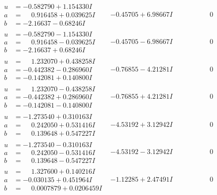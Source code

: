 \documentclass[1p]{elsarticle_modified}
\theoremstyle{definition}
\begin{document}
$$\begin{array}{c|c|c}
\begin{aligned}
u &= -0.582790 + 1.154330 I \\
a &= \phantom{-}0.916458 + 0.039625 I \\
b &= -2.16637 - 0.68246 I\end{aligned}
 & -0.45705 + 6.98667 I & \phantom{-0.000000 } 0 \\ \hline\begin{aligned}
u &= -0.582790 - 1.154330 I \\
a &= \phantom{-}0.916458 - 0.039625 I \\
b &= -2.16637 + 0.68246 I\end{aligned}
 & -0.45705 - 6.98667 I & \phantom{-0.000000 } 0 \\ \hline\begin{aligned}
u &= \phantom{-}1.232070 + 0.438258 I \\
a &= -0.442382 - 0.286960 I \\
b &= -0.142081 + 0.140800 I\end{aligned}
 & -0.76855 - 4.21281 I & \phantom{-0.000000 } 0 \\ \hline\begin{aligned}
u &= \phantom{-}1.232070 - 0.438258 I \\
a &= -0.442382 + 0.286960 I \\
b &= -0.142081 - 0.140800 I\end{aligned}
 & -0.76855 + 4.21281 I & \phantom{-0.000000 } 0 \\ \hline\begin{aligned}
u &= -1.273540 + 0.310163 I \\
a &= \phantom{-}0.242050 + 0.531416 I \\
b &= \phantom{-}0.139648 + 0.547227 I\end{aligned}
 & -4.53192 + 3.12942 I & \phantom{-0.000000 } 0 \\ \hline\begin{aligned}
u &= -1.273540 - 0.310163 I \\
a &= \phantom{-}0.242050 - 0.531416 I \\
b &= \phantom{-}0.139648 - 0.547227 I\end{aligned}
 & -4.53192 - 3.12942 I & \phantom{-0.000000 } 0 \\ \hline\begin{aligned}
u &= \phantom{-}1.327600 + 0.140216 I \\
a &= -0.030135 + 0.451964 I \\
b &= \phantom{-}0.0007879 + 0.0206459 I\end{aligned}
 & -1.12285 + 2.47491 I & \phantom{-0.000000 } 0 \\ \hline\begin{aligned}

\end{aligned}
\end{array}$$
\end{document}
